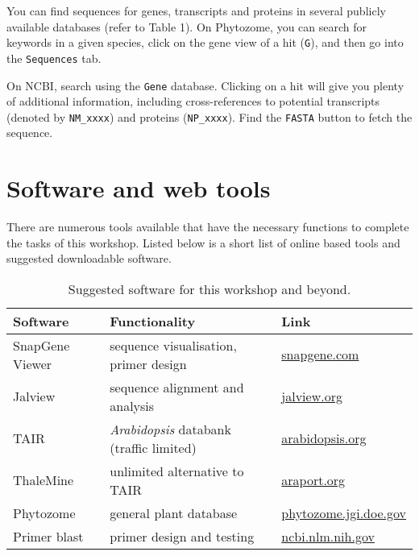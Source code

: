 \documentclass[11pt]{article}
\begin{document}
    You can find sequences for genes, transcripts and proteins in several publicly available databases (refer to Table 1). On Phytozome, you can search for keywords in a given species, click on the gene view of a hit (\texttt{G}), and then go into the \texttt{Sequences} tab.
    
    On NCBI, search using the \texttt{Gene} database. Clicking on a hit will give you plenty of additional information, including cross-references to potential transcripts (denoted by \texttt{NM\_xxxx}) and proteins (\texttt{NP\_xxxx}). Find the \texttt{FASTA} button to fetch the sequence.
 
 	\section*{Software and web tools}
 	
 	There are numerous tools available that have the necessary functions to complete the tasks of this workshop. Listed below is a short list of online based tools and suggested downloadable software.
 	
 	\begin{table}[h!]
 	\footnotesize
 	\caption{Suggested software for this workshop and beyond.}
 	\centering
 	\begin{tabular}{@{}lll}
 		\toprule
 		Software & Functionality & Link \\
 		\midrule
 		SnapGene Viewer	& sequence visualisation, primer design & \href{https://www.snapgene.com/snapgene-viewer/}{snapgene.com} \\ 
 		Jalview & sequence alignment and analysis & \href{http://www.jalview.org/getdown/release/#}{jalview.org}\\
 		TAIR & \textit{Arabidopsis} databank (traffic limited) & \href{https://www.arabidopsis.org}{arabidopsis.org} \\ 
 		ThaleMine & unlimited alternative to TAIR &  \href{https://apps.araport.org/thalemine/begin.do}{araport.org} \\ 
 		Phytozome & general plant database & \href{https://phytozome.jgi.doe.gov/pz/portal.html#}{phytozome.jgi.doe.gov}\\ 
 		Primer blast & primer design and testing & \href{https://www.ncbi.nlm.nih.gov/tools/primer-blast/}{ncbi.nlm.nih.gov} \\
 		\bottomrule
 	\end{tabular}
  	\end{table}
 
\end{document}
